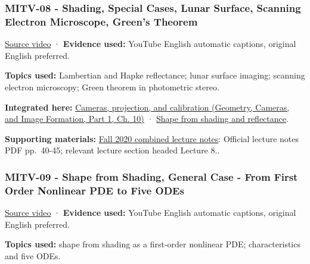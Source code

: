\subsubsection{MITV-08 - Shading, Special Cases, Lunar Surface, Scanning Electron Microscope, Green's Theorem}\label{04-visual-computing-ii-ch036-mitv-08---shading-special-cases-lunar-surface-scanning-electron-microscope-greens-theorem}

\hypertarget{04-visual-computing-ii-ch036-mitv-08---shading-special-cases-lunar-surface-scanning-electron-microscope-greens-theorem}{}

\href{https://www.youtube.com/watch?v=LP7z6vVmnms}{Source video} · \textbf{Evidence used:} YouTube English automatic captions, original English preferred.

\textbf{Topics used:} Lambertian and Hapke reflectance; lunar surface imaging; scanning electron microscopy; Green theorem in photometric stereo.

\textbf{Integrated here:} \href{../03-Geometry-Cameras-and-Image-Formation-P01/main.pdf\#03-visual-computing-i-ch003-cameras-projection-and-calibration}{Cameras, projection, and calibration (Geometry, Cameras, and Image Formation, Part 1, Ch. 10)} · \hyperref[04-visual-computing-ii-ch032-shape-from-shading-and-reflectance]{Shape from shading and reflectance}.

\textbf{Supporting materials:} \href{https://ocw.mit.edu/courses/6-801-machine-vision-fall-2020/9ec44f69e72995c370b3797818ba01e6_MIT6_801F20_lectureNotes.pdf}{Fall 2020 combined lecture notes}: Official lecture notes PDF pp.~40-45; relevant lecture section headed Lecture 8..

\subsubsection{MITV-09 - Shape from Shading, General Case - From First Order Nonlinear PDE to Five ODEs}\label{04-visual-computing-ii-ch036-mitv-09---shape-from-shading-general-case---from-first-order-nonlinear-pde-to-five-odes}

\hypertarget{04-visual-computing-ii-ch036-mitv-09---shape-from-shading-general-case---from-first-order-nonlinear-pde-to-five-odes}{}

\href{https://www.youtube.com/watch?v=J4gbaRyWpoM}{Source video} · \textbf{Evidence used:} YouTube English automatic captions, original English preferred.

\textbf{Topics used:} shape from shading as a first-order nonlinear PDE; characteristics and five ODEs.

